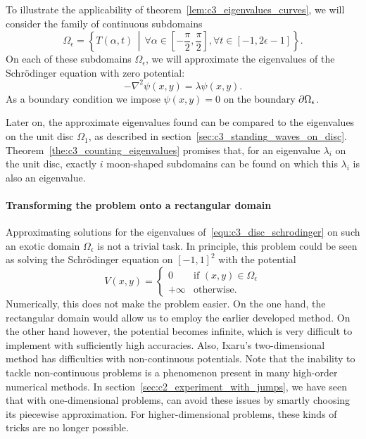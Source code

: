 To illustrate the applicability of theorem~\ref{lem:c3_eigenvalues_curves}, we will consider the family of continuous subdomains
$$
  \Omega_\epsilon = \left\{T(\alpha, t) \,\middle|\, \forall \alpha \in \left[-\frac{\pi}{2}, \frac{\pi}{2}\right], \forall t \in [-1, 2\epsilon - 1]  \right\}\text{.}
$$
On each of these subdomains $\Omega_\epsilon$, we will approximate the eigenvalues of the Schrödinger equation with zero potential:
\begin{equation}\label{equ:c3_disc_schrodinger}
  -\nabla^2 \psi(x, y) = \lambda \psi(x, y)\text{.}
\end{equation}
As a boundary condition we impose $\psi(x, y) = 0$ on the boundary $\partial\Omega_\epsilon$.

Later on, the approximate eigenvalues found can be compared to the eigenvalues on the unit disc $\Omega_1$, as described in section~\ref{sec:c3_standing_waves_on_disc}. Theorem~\ref{the:c3_counting_eigenvalues} promises that, for an eigenvalue $\lambda_i$ on the unit disc, exactly $i$ moon-shaped subdomains can be found on which this $\lambda_i$ is also an eigenvalue.

\paragraph{Transforming the problem onto a rectangular domain}

Approximating solutions for the eigenvalues of~\eqref{equ:c3_disc_schrodinger} on such an exotic domain $\Omega_\epsilon$ is not a trivial task. In principle, this problem could be seen as solving the Schrödinger equation on $[-1,1]^2$ with the potential
$$
  V(x, y) = \begin{cases}
    0       & \text{if $(x, y)\in \Omega_\epsilon$} \\
    +\infty & \text{otherwise.}
  \end{cases}
$$
Numerically, this does not make the problem easier. On the one hand, the rectangular domain would allow us to employ the earlier developed method. On the other hand however, the potential becomes infinite, which is very difficult to implement with sufficiently high accuracies. Also, Ixaru's two-dimensional method has difficulties with non-continuous potentials. Note that the inability to tackle non-continuous problems is a phenomenon present in many high-order numerical methods. In section~\ref{sec:c2_experiment_with_jumps}, we have seen that with one-dimensional problems, \matslise{} can avoid these issues by smartly choosing its piecewise approximation. For higher-dimensional problems, these kinds of tricks are no longer possible.

